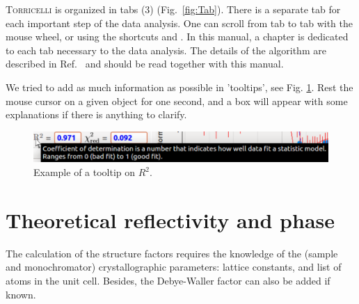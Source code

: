 \documentclass[oldfontcommands,openany,oneside]{memoir}
\begin{document}
  \textsc{Torricelli} is organized in tabs (3) (Fig.~\ref{fig:Tab}). There is a separate tab for each important step of the data analysis. One can scroll from tab to tab with the mouse wheel, or using the shortcuts  and . In this manual, a chapter is dedicated to each tab necessary to the data analysis. The details of the algorithm are described in Ref.~\cite{Bocquet2018} and should be read together with this manual.

We tried to add as much information as possible in 'tooltips', see Fig. \ref{fig:tooltip}. Rest the mouse cursor on a given object for one second, and a box will appear with some explanations if there is anything to clarify.

\begin{figure}[!h]
  \centering
  \includegraphics[width=\textwidth]{img/Screenshot_Tooltip.pdf}
  \caption{Example of a tooltip on $R^2$.}
  \label{fig:tooltip}
\end{figure}

\chapter{Theoretical reflectivity and phase} \label{chap:structureFactor}
The calculation of the structure factors requires the knowledge of the (sample and monochromator) crystallographic parameters: lattice constants, and list of atoms in the unit cell. Besides, the Debye-Waller factor can also be added if known. 
\end{document}
